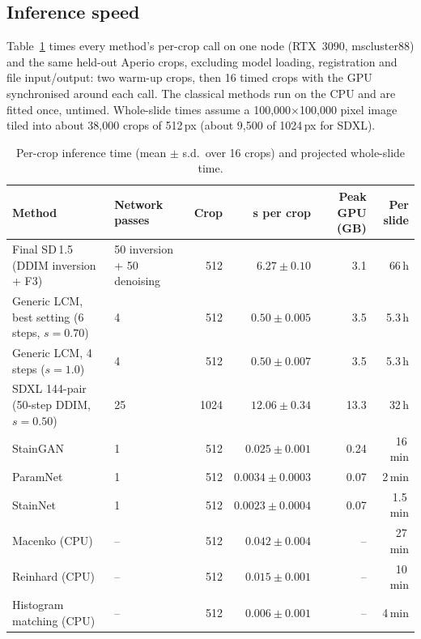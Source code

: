 \subsection{Inference speed}
Table~\ref{tab:app-speed} times every method's per-crop call on one node (RTX~3090, mscluster88) and the
same held-out Aperio crops, excluding model loading, registration and file input/output: two warm-up crops,
then 16 timed crops with the GPU synchronised around each call. The classical methods run on the CPU and are
fitted once, untimed. Whole-slide times assume a 100{,}000$\times$100{,}000 pixel image tiled into about
38{,}000 crops of 512\,px (about 9{,}500 of 1024\,px for SDXL).

\begin{table}[!tbp]
\centering
\caption{Per-crop inference time (mean $\pm$ s.d.\ over 16 crops) and projected whole-slide time.}
\label{tab:app-speed}
\footnotesize
\begin{tabular}{llrrrr}
\toprule
Method & Network passes & Crop & s per crop & Peak GPU (GB) & Per slide\\
\midrule
Final SD\,1.5 (DDIM inversion + F3) & 50 inversion + 50 denoising & 512 & $6.27\pm0.10$ & 3.1 & 66\,h\\
Generic LCM, best setting (6 steps, $s=0.70$) & 4 & 512 & $0.50\pm0.005$ & 3.5 & 5.3\,h\\
Generic LCM, 4 steps ($s=1.0$) & 4 & 512 & $0.50\pm0.007$ & 3.5 & 5.3\,h\\
SDXL 144-pair (50-step DDIM, $s=0.50$) & 25 & 1024 & $12.06\pm0.34$ & 13.3 & 32\,h\\
StainGAN & 1 & 512 & $0.025\pm0.001$ & 0.24 & 16\,min\\
ParamNet & 1 & 512 & $0.0034\pm0.0003$ & 0.07 & 2\,min\\
StainNet & 1 & 512 & $0.0023\pm0.0004$ & 0.07 & 1.5\,min\\
Macenko (CPU) & -- & 512 & $0.042\pm0.004$ & -- & 27\,min\\
Reinhard (CPU) & -- & 512 & $0.015\pm0.001$ & -- & 10\,min\\
Histogram matching (CPU) & -- & 512 & $0.006\pm0.001$ & -- & 4\,min\\
\bottomrule
\end{tabular}
\end{table}
